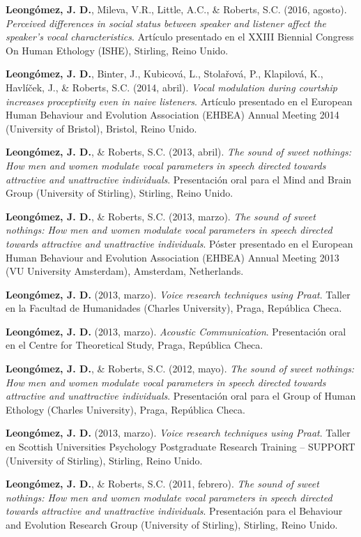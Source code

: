 \documentclass[11pt,a4paper,]{awesome-cv}
\begin{document}
\textbf{Leongómez, J. D.}, Mileva, V.R., Little, A.C., \& Roberts, S.C.
(2016, agosto). \emph{Perceived differences in social status between
speaker and listener affect the speaker's vocal characteristics}.
Artículo presentado en el XXIII Biennial Congress On Human Ethology
(ISHE), Stirling, Reino Unido.

\textbf{Leongómez, J. D.}, Binter, J., Kubicová, L., Stolařová, P.,
Klapilová, K., Havlíček, J., \& Roberts, S.C. (2014, abril). \emph{Vocal
modulation during courtship increases proceptivity even in naive
listeners}. Artículo presentado en el European Human Behaviour and
Evolution Association (EHBEA) Annual Meeting 2014 (University of
Bristol), Bristol, Reino Unido.

\textbf{Leongómez, J. D.}, \& Roberts, S.C. (2013, abril). \emph{The
sound of sweet nothings: How men and women modulate vocal parameters in
speech directed towards attractive and unattractive individuals}.
Presentación oral para el Mind and Brain Group (University of Stirling),
Stirling, Reino Unido.

\textbf{Leongómez, J. D.}, \& Roberts, S.C. (2013, marzo). \emph{The
sound of sweet nothings: How men and women modulate vocal parameters in
speech directed towards attractive and unattractive individuals}. Póster
presentado en el European Human Behaviour and Evolution Association
(EHBEA) Annual Meeting 2013 (VU University Amsterdam), Amsterdam,
Netherlands.

\textbf{Leongómez, J. D.} (2013, marzo). \emph{Voice research techniques
using Praat}. Taller en la Facultad de Humanidades (Charles University),
Praga, República Checa.

\textbf{Leongómez, J. D.} (2013, marzo). \emph{Acoustic Communication}.
Presentación oral en el Centre for Theoretical Study, Praga, República
Checa.

\textbf{Leongómez, J. D.}, \& Roberts, S.C. (2012, mayo). \emph{The
sound of sweet nothings: How men and women modulate vocal parameters in
speech directed towards attractive and unattractive individuals}.
Presentación oral para el Group of Human Ethology (Charles University),
Praga, República Checa.

\textbf{Leongómez, J. D.} (2013, marzo). \emph{Voice research techniques
using Praat}. Taller en Scottish Universities Psychology Postgraduate
Research Training -- SUPPORT (University of Stirling), Stirling, Reino
Unido.

\textbf{Leongómez, J. D.}, \& Roberts, S.C. (2011, febrero). \emph{The
sound of sweet nothings: How men and women modulate vocal parameters in
speech directed towards attractive and unattractive individuals}.
Presentación para el Behaviour and Evolution Research Group (University
of Stirling), Stirling, Reino Unido.
\end{document}
